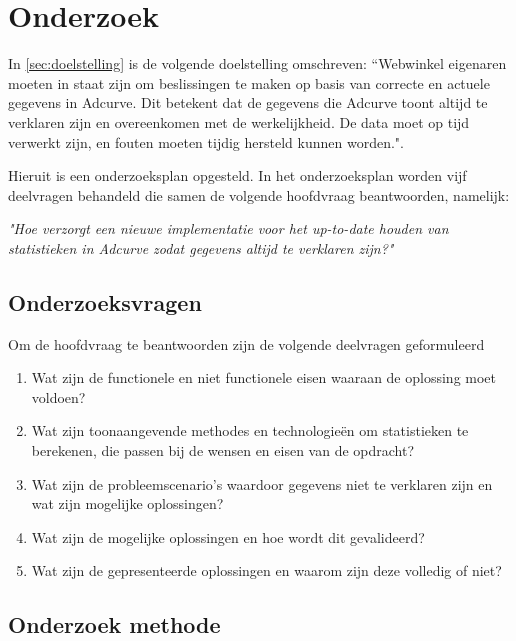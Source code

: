 \section{Onderzoek}

In \ref{sec:doelstelling} is de volgende doelstelling omschreven: ``Webwinkel eigenaren moeten in staat zijn om beslissingen te maken op basis van correcte en actuele gegevens in Adcurve. Dit betekent dat de gegevens die Adcurve toont altijd te verklaren zijn en overeenkomen met de werkelijkheid. De data moet op tijd verwerkt zijn, en fouten moeten tijdig hersteld kunnen worden.". 

Hieruit is een onderzoeksplan opgesteld. In het onderzoeksplan worden vijf deelvragen behandeld die samen de volgende 
hoofdvraag beantwoorden, namelijk:

\medskip
{\large \textit{"Hoe verzorgt een nieuwe implementatie voor het up-to-date houden van statistieken in Adcurve zodat gegevens altijd te verklaren zijn?"}}
\medskip

\subsection{Onderzoeksvragen}

Om de hoofdvraag te beantwoorden zijn de volgende deelvragen geformuleerd

\begin{enumerate}
\item Wat zijn de functionele en niet functionele eisen waaraan de oplossing moet voldoen?
\item Wat zijn toonaangevende methodes en technologieën om statistieken te berekenen, die passen bij de wensen en eisen van de opdracht?
\item Wat zijn de probleemscenario's waardoor gegevens niet te verklaren zijn en wat zijn mogelijke oplossingen?
\item Wat zijn de mogelijke oplossingen en hoe wordt dit gevalideerd?
\item Wat zijn de gepresenteerde oplossingen en waarom zijn deze volledig of niet?
\end{enumerate}


\newpage
\subsection{Onderzoek methode} %
\label{sec:onderzoekmethode}

